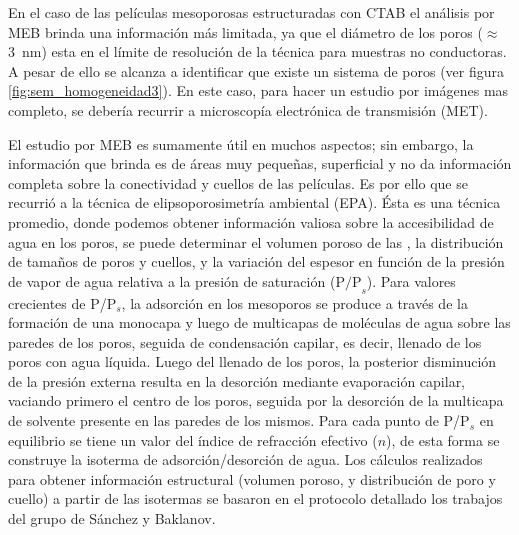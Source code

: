 		 En el caso de las películas mesoporosas estructuradas con CTAB el análisis por MEB brinda una información más limitada, ya que el diámetro de los poros ($\approx$ \SI{3}{\nm}) esta en el límite de resolución de la técnica para muestras no conductoras. A pesar de ello se alcanza a identificar que existe un sistema de poros (ver figura \ref{fig:sem_homogeneidad3}). En este caso, para hacer un estudio por imágenes mas completo, se debería recurrir a microscopía electrónica de transmisión (MET).

		 El estudio por MEB es sumamente útil en muchos aspectos; sin embargo, la información que brinda es de áreas muy pequeñas, superficial y no da información completa sobre la conectividad y cuellos de las películas. Es por ello que se recurrió a la técnica de elipsoporosimetría ambiental (EPA). Ésta es una técnica promedio, donde podemos obtener información valiosa sobre la accesibilidad de agua en los poros, se puede determinar el volumen poroso de las \pdm, la distribución de tamaños de poros y cuellos, y la variación del espesor en función de la presión de vapor de agua relativa a la presión de saturación ($\text{P/P}_s$). Para valores crecientes de P/P$_s$, la adsorción en los mesoporos se produce a través de la formación de una monocapa y luego de multicapas de moléculas de agua sobre las paredes de los poros, seguida de condensación capilar, es decir, llenado de los poros con agua líquida. Luego del llenado de los poros, la posterior disminución de la presión externa resulta en la desorción mediante evaporación capilar, vaciando primero el centro de los poros, seguida por la desorción de la multicapa de solvente presente en las paredes de los mismos. Para cada punto de P/P$_s$ en equilibrio se tiene un valor del índice de refracción efectivo ($n$), de esta forma se construye la isoterma de adsorción/desorción de agua. Los cálculos realizados para obtener información estructural (volumen poroso, y distribución de poro y cuello) a partir de las isotermas se basaron en el protocolo detallado los trabajos del grupo de Sánchez y Baklanov\cite{Baklanov2000,Boissiere2005,Sakatani2006}. 

